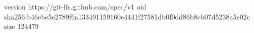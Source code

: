 version https://git-lfs.github.com/spec/v1
oid sha256:b46ebe5e2789f6a133491159160e4441f27581db0f0dd86b8cb07d5238a5e02c
size 124479
